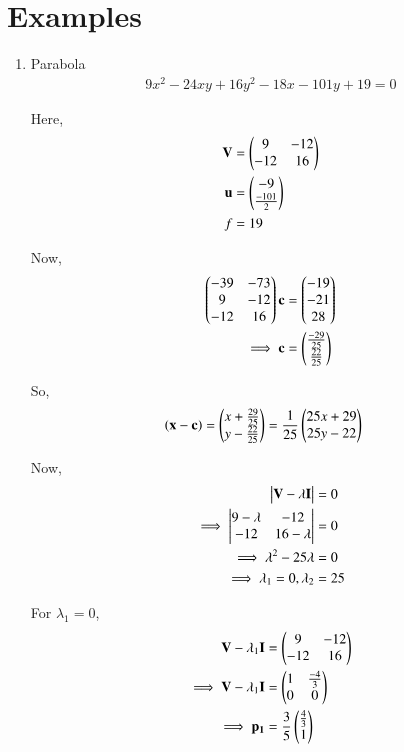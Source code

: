 \documentclass[journal,12pt,twocolumn]{IEEEtran}
\begin{document}
\section{Examples}

\begin{enumerate}
    \item Parabola
    \begin{align}
    9x^2-24xy+16y^2-18x-101y+19 = 0
    \end{align}
    
    Here,
    \begin{align}
    \mathbf{V} &= \begin{pmatrix}9 & -12 \\ -12 & 16\end{pmatrix} \\
    \mathbf{u} &= \begin{pmatrix}-9 \\ \frac{-101}{2}\end{pmatrix} \\
    f &= 19
    \end{align}

    Now,
    \begin{align}
    \begin{pmatrix}-39 & -73 \\ 9 & -12 \\ -12 & 16\end{pmatrix}\mathbf{c} &= \begin{pmatrix}-19 \\ -21 \\ 28\end{pmatrix}
    \\
    \implies \mathbf{c} &= \begin{pmatrix}\frac{-29}{25} \\ \frac{22}{25}\end{pmatrix}
    \end{align}
    
    So,
    \begin{align}
    \left(\mathbf{x}-\mathbf{c}\right) &= \begin{pmatrix}x+\frac{29}{25} \\ y-\frac{22}{25}\end{pmatrix}=\frac{1}{25}\begin{pmatrix}25x+29 \\ 25y-22\end{pmatrix}
    \end{align}
    
    Now,
    \begin{align}
        \begin{vmatrix}\mathbf{V}-\lambda\mathbf{I}\end{vmatrix} &= 0 \\
        \implies \begin{vmatrix}9-\lambda & -12 \\ -12 & 16-\lambda\end{vmatrix} &= 0 \\
        \implies \lambda^2-25\lambda &= 0 \\
        \implies \lambda_1 =0,\lambda_2 &= 25
    \end{align}
    
    For $\lambda_1=0$,
    \begin{align}
        \mathbf{V}-\lambda_1\mathbf{I} &= \begin{pmatrix}9 & -12 \\ -12 & 16\end{pmatrix} \\
        \implies \mathbf{V}-\lambda_1\mathbf{I} &= \begin{pmatrix}1 & \frac{-4}{3} \\ 0 & 0\end{pmatrix} \\
        \implies \mathbf{p_1} &=\frac{3}{5}\begin{pmatrix}\frac{4}{3} \\ 1\end{pmatrix}
    \end{align}
    

\end{enumerate}
\end{document}
